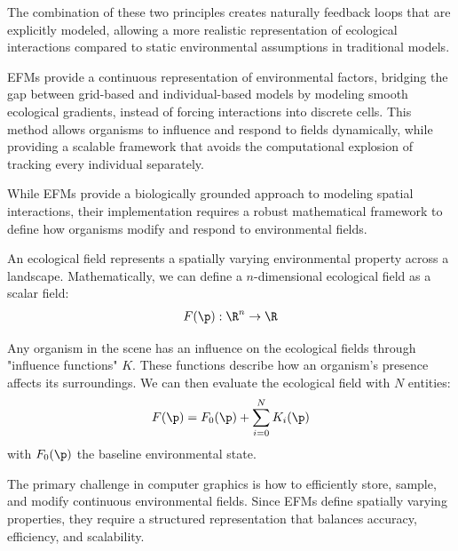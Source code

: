 The combination of these two principles creates naturally feedback loops that are explicitly modeled, allowing a more realistic representation of ecological interactions compared to static environmental assumptions in traditional models.





EFMs provide a continuous representation of environmental factors, bridging the gap between grid-based and individual-based models by modeling smooth ecological gradients, instead of forcing interactions into discrete cells. This method allows organisms to influence and respond to fields dynamically, while providing a scalable framework that avoids the computational explosion of tracking every individual separately.


While EFMs provide a biologically grounded approach to modeling spatial interactions, their implementation requires a robust mathematical framework to define how organisms modify and respond to environmental fields. 





An ecological field represents a spatially varying environmental property across a landscape. Mathematically, we can define a $n$-dimensional ecological field as a scalar field:
\begin{align}
    F(\p) : \R^n \to \R
\end{align}

Any organism in the scene has an influence on the ecological fields through "influence functions" $K$. These functions describe how an organism's presence affects its surroundings. We can then evaluate the ecological field with $N$ entities:
\begin{align}
    \label{eq:env-obj_eco-field-computation}
    F(\p) = F_0(\p) + \sum_{i=0}^{N}{K_i(\p)} 
\end{align}
with $F_0(\p)$ the baseline environmental state.




The primary challenge in computer graphics is how to efficiently store, sample, and modify continuous environmental fields. Since EFMs define spatially varying properties, they require a structured representation that balances accuracy, efficiency, and scalability.

